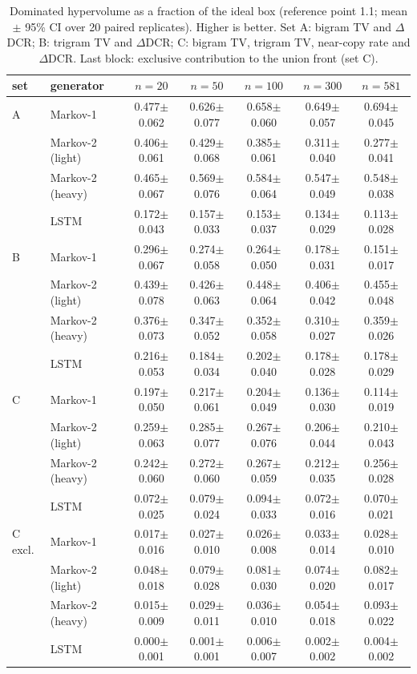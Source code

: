 \begin{table}[!t]
\caption{Dominated hypervolume as a fraction of the ideal box (reference point 1.1; mean $\pm$ 95\% CI over 20 paired replicates). Higher is better. Set A: bigram TV and $\Delta$DCR; B: trigram TV and $\Delta$DCR; C: bigram TV, trigram TV, near-copy rate and $\Delta$DCR. Last block: exclusive contribution to the union front (set C).}
\label{tab:supp-hv}
\centering\scriptsize
\begin{tabular}{llccccc}
\toprule
set & generator & $n{=}20$ & $n{=}50$ & $n{=}100$ & $n{=}300$ & $n{=}581$ \\
\midrule
A & Markov-1 & 0.477$\pm$0.062 & 0.626$\pm$0.077 & 0.658$\pm$0.060 & 0.649$\pm$0.057 & 0.694$\pm$0.045 \\
 & Markov-2 (light) & 0.406$\pm$0.061 & 0.429$\pm$0.068 & 0.385$\pm$0.061 & 0.311$\pm$0.040 & 0.277$\pm$0.041 \\
 & Markov-2 (heavy) & 0.465$\pm$0.067 & 0.569$\pm$0.076 & 0.584$\pm$0.064 & 0.547$\pm$0.049 & 0.548$\pm$0.038 \\
 & LSTM & 0.172$\pm$0.043 & 0.157$\pm$0.033 & 0.153$\pm$0.037 & 0.134$\pm$0.029 & 0.113$\pm$0.028 \\
\midrule
B & Markov-1 & 0.296$\pm$0.067 & 0.274$\pm$0.058 & 0.264$\pm$0.050 & 0.178$\pm$0.031 & 0.151$\pm$0.017 \\
 & Markov-2 (light) & 0.439$\pm$0.078 & 0.426$\pm$0.063 & 0.448$\pm$0.064 & 0.406$\pm$0.042 & 0.455$\pm$0.048 \\
 & Markov-2 (heavy) & 0.376$\pm$0.073 & 0.347$\pm$0.052 & 0.352$\pm$0.058 & 0.310$\pm$0.027 & 0.359$\pm$0.026 \\
 & LSTM & 0.216$\pm$0.053 & 0.184$\pm$0.034 & 0.202$\pm$0.040 & 0.178$\pm$0.028 & 0.178$\pm$0.029 \\
\midrule
C & Markov-1 & 0.197$\pm$0.050 & 0.217$\pm$0.061 & 0.204$\pm$0.049 & 0.136$\pm$0.030 & 0.114$\pm$0.019 \\
 & Markov-2 (light) & 0.259$\pm$0.063 & 0.285$\pm$0.077 & 0.267$\pm$0.076 & 0.206$\pm$0.044 & 0.210$\pm$0.043 \\
 & Markov-2 (heavy) & 0.242$\pm$0.060 & 0.272$\pm$0.060 & 0.267$\pm$0.059 & 0.212$\pm$0.035 & 0.256$\pm$0.028 \\
 & LSTM & 0.072$\pm$0.025 & 0.079$\pm$0.024 & 0.094$\pm$0.033 & 0.072$\pm$0.016 & 0.070$\pm$0.021 \\
\midrule
C excl. & Markov-1 & 0.017$\pm$0.016 & 0.027$\pm$0.010 & 0.026$\pm$0.008 & 0.033$\pm$0.014 & 0.028$\pm$0.010 \\
 & Markov-2 (light) & 0.048$\pm$0.018 & 0.079$\pm$0.028 & 0.081$\pm$0.030 & 0.074$\pm$0.020 & 0.082$\pm$0.017 \\
 & Markov-2 (heavy) & 0.015$\pm$0.009 & 0.029$\pm$0.011 & 0.036$\pm$0.010 & 0.054$\pm$0.018 & 0.093$\pm$0.022 \\
 & LSTM & 0.000$\pm$0.001 & 0.001$\pm$0.001 & 0.006$\pm$0.007 & 0.002$\pm$0.002 & 0.004$\pm$0.002 \\
\bottomrule
\end{tabular}
\end{table}
